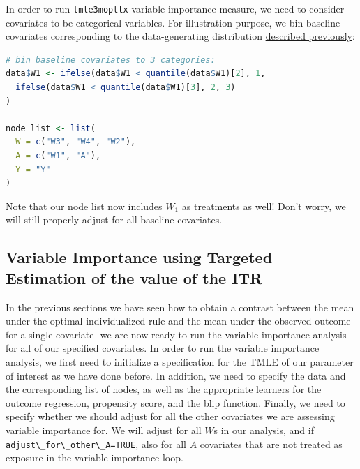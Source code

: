 \documentclass[12pt, krantz2,]{krantz}
\newcommand{\passthrough}[1]{#1}
\theoremstyle{definition}
\theoremstyle{definition}
\theoremstyle{definition}
\newcommand{\1}{\mathbbm{1}}
\begin{document}
In order to run \passthrough{\lstinline!tmle3mopttx!} variable importance measure, we need to consider
covariates to be categorical variables. For illustration purpose, we bin
baseline covariates corresponding to the data-generating distribution
\protect\hyperlink{oit-eval}{described previously}:

\begin{lstlisting}[language=R]
# bin baseline covariates to 3 categories:
data$W1 <- ifelse(data$W1 < quantile(data$W1)[2], 1,
  ifelse(data$W1 < quantile(data$W1)[3], 2, 3)
)

node_list <- list(
  W = c("W3", "W4", "W2"),
  A = c("W1", "A"),
  Y = "Y"
)
\end{lstlisting}

Note that our node list now includes \(W_1\) as treatments as well! Don't worry,
we will still properly adjust for all baseline covariates.

\hypertarget{variable-importance-using-targeted-estimation-of-the-value-of-the-itr}{%
\subsection{Variable Importance using Targeted Estimation of the value of the ITR}\label{variable-importance-using-targeted-estimation-of-the-value-of-the-itr}}

In the previous sections we have seen how to obtain a contrast between the mean
under the optimal individualized rule and the mean under the observed outcome
for a single covariate- we are now ready to run the variable importance analysis
for all of our specified covariates. In order to run the variable importance
analysis, we first need to initialize a specification for the TMLE of our
parameter of interest as we have done before. In addition, we need to specify
the data and the corresponding list of nodes, as well as the appropriate
learners for the outcome regression, propensity score, and the blip function.
Finally, we need to specify whether we should adjust for all the other
covariates we are assessing variable importance for. We will adjust for all \(W\)s
in our analysis, and if \passthrough{\lstinline!adjust\_for\_other\_A=TRUE!}, also for all \(A\) covariates
that are not treated as exposure in the variable importance loop.
\end{document}
